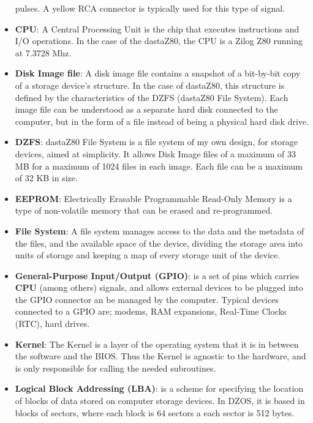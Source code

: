 \begin{itemize}
        pulses. A yellow RCA connector is typically used for this type of signal.
    \item \textbf{CPU}: A Central Processing Unit is the chip that executes
        instructions and I/O operations. In the case of the dastaZ80, the CPU is
        a Zilog Z80 running at 7.3728 Mhz.
    \item \textbf{Disk Image file}: A disk image file contains a snapshot of a
        bit-by-bit copy of a storage device's structure. In the case of dastaZ80,
        this structure is defined by the characteristics of the DZFS (dastaZ80
        File System). Each image file can be understood as a separate hard disk
        connected to the computer, but in the form of a file instead of being a
        physical hard disk drive.
    \item \textbf{DZFS}: dastaZ80 File System is a file system of my own design,
        for storage devices, aimed at simplicity. It allows Disk Image files of
        a maximum of 33 MB for a maximum of 1024 files in each image. Each file
        can be a maximum of 32 KB in size.
    \item \textbf{EEPROM}: Electrically Erasable Programmable Read-Only Memory
        is a type of non-volatile memory that can be erased and re-programmed.
    \item \textbf{File System}: A file system manages access to the data and the
        metadata of the files, and the available space of the device, dividing
        the storage area into units of storage and keeping a map of every
        storage unit of the device.
    \item \textbf{General-Purpose Input/Output (GPIO)}: is a set of pins which
        carries \textbf{CPU} (among others) signals, and allows external devices
        to be plugged into the GPIO connector an be managed by the computer.
        Typical devices connected to a GPIO are; modems, RAM expansions,
        Real-Time Clocks (RTC), hard drives.
    \item \textbf{Kernel}: The Kernel is a layer of the operating system that
        it is in between the software and the BIOS. Thus the Kernel is agnostic
        to the hardware, and is only responsible for calling the needed
        subroutines.
    \item \textbf{Logical Block Addressing (LBA)}: is a scheme for specifying
        the location of blocks of data stored on computer storage devices. In
        DZOS, it is based in blocks of sectors, where each block is 64 sectors
        a each sector is 512 bytes.

\end{itemize}
